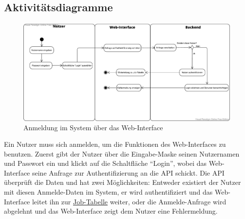 \subsection{Aktivitätsdiagramme}
\begin{figure}[H]
    \centering
    \includegraphics[width=\textwidth]{images-interface/v3_aktivitaetsdiagramme/Anmelden_v10.pdf}
    \caption{Anmeldung im System über das \gls{Web-Interface}}
    \label{fig:login_activity}
    
\end{figure}
Ein \gls{Nutzer} muss sich anmelden, um die Funktionen des \gls{Web-Interface}s zu benutzen. Zuerst gibt der \gls{Nutzer} über die Eingabe-Maske seinen Nutzernamen und Passwort ein und klickt auf die Schaltfläche \enquote{Login}, wobei das \gls{Web-Interface} seine Anfrage zur Authentifizierung an die \gls{API} schickt. Die \gls{API} überprüft die Daten und hat zwei Möglichkeiten: Entweder existiert der \gls{Nutzer} mit diesen Anmelde-Daten im System, er wird authentifiziert und das \gls{Web-Interface} leitet ihn zur \hyperref[pages:job-table]{Job-Tabelle} weiter, oder die Anmelde-Anfrage wird abgelehnt und das \gls{Web-Interface} zeigt dem \gls{Nutzer} eine Fehlermeldung.


